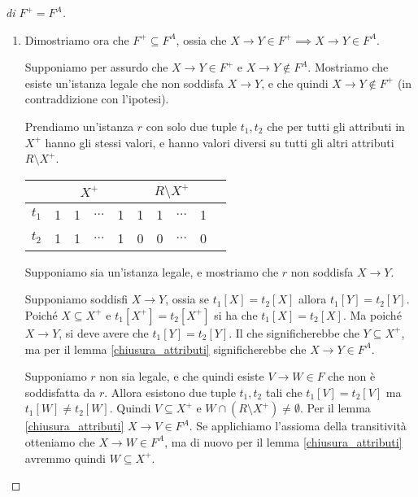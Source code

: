 \begin{proof}[di $F^+ = F^A$]
\begin{enumerate}
\begin{enumerate}
        Sia $r$ una qualsiasi istanza legale di $R$, e siano $t_1, t_2$ due tuple di $r$ tali che $t_1[X] = t_2[X]$. Quindi per l'ipotesi induttiva, $t_1[Z] = t_2[Z]$, e quindi ancora per ipotesi induttiva $t_1[Y] = t_2[Y]$.
    \end{enumerate}
    \item Dimostriamo ora che $F^+ \subseteq F^A$, ossia che $X \to Y \in F^+ \implies X \to Y \in F^A$.

    Supponiamo per assurdo che $X \to Y \in F^+$ e $X \to Y \notin F^A$. Mostriamo che esiste un'istanza legale che non soddisfa $X \to Y$, e che quindi $X \to Y \notin F^+$ (in contraddizione con l'ipotesi).

    Prendiamo un'istanza $r$ con solo due tuple $t_1, t_2$ che per tutti gli attributi in $X^+$ hanno gli stessi valori, e hanno valori diversi su tutti gli altri attributi $R \setminus X^+$.
    \begin{center}
    \begin{tabular}{|l|*{9}{c|}}
    \hline
    & \multicolumn{4}{c|}{$X^+$} 
    & \multicolumn{4}{c|}{$R \setminus X^+$} \\
    \hline
    $t_1$ & 1 & 1 & $\dots$ & 1 & 1 & 1 & $\dots$ & 1 \\
    \hline
    $t_2$ & 1 & 1 & $\dots$ & 1 & 0 & 0 & $\dots$ & 0 \\
    \hline 
    \end{tabular}
    \end{center}
    Supponiamo sia un'istanza legale, e mostriamo che $r$ non soddisfa $X \to Y$.

    Supponiamo soddisfi $X \to Y$, ossia se $t_1[X] = t_2[X]$ allora $t_1[Y] = t_2[Y]$. Poich\'e $X \subseteq X^+$ e $t_1[X^+] = t_2[X^+]$ si ha che $t_1[X] = t_2[X]$. Ma poich\'e $X \to Y$, si deve avere che $t_1[Y] = t_2[Y]$. Il che significherebbe che $Y \subseteq X^+$, ma per il lemma \ref{chiusura_attributi} significherebbe che $X \to Y \in F^A$.

    Supponiamo $r$ non sia legale, e che quindi esiste $V \to W \in F$ che non \`e soddisfatta da $r$. Allora esistono due tuple $t_1, t_2$ tali che $t_1[V] = t_2[V]$ ma $t_1[W] \neq t_2[W]$. Quindi $V \subseteq X^+$ e $W \cap (R \setminus X^+) \neq \emptyset$. Per il lemma \ref{chiusura_attributi} $X \to V \in F^A$. Se applichiamo l'assioma della transitivit\`a otteniamo che $X \to W \in F^A$, ma di nuovo per il lemma \ref{chiusura_attributi} avremmo quindi $W \subseteq X^+$.
\end{enumerate}
\end{proof}


